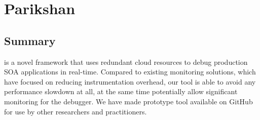 \chapter{Parikshan}
\label{ch:parikshan}


%





\section{Summary}
\label{sec:parikshanSummary}

\parikshan is a novel framework that uses redundant cloud resources to debug production SOA applications in real-time.
Compared to existing monitoring solutions, which have focused on reducing instrumentation overhead, our tool is able to avoid any performance slowdown at all, at the same time potentially allow significant monitoring for the debugger.
We have made \parikshan prototype tool available on GitHub for use by other researchers and practitioners.






